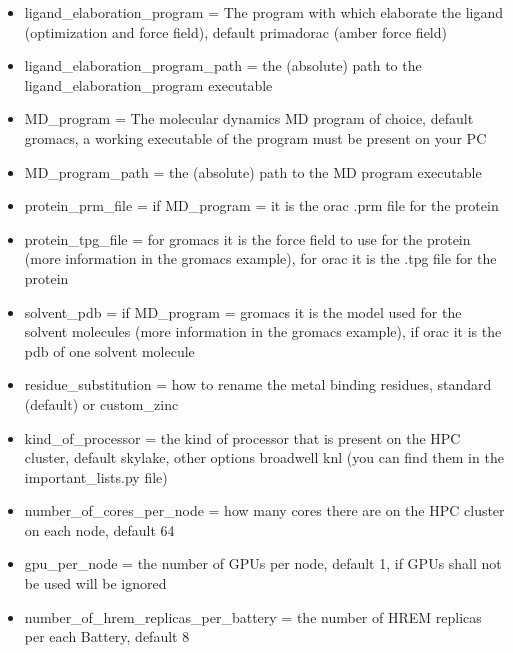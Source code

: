 \begin{itemize}
				\item ligand\_elaboration\_program = The program with which elaborate the ligand (optimization and force field), default primadorac (amber force field)
				
				\item ligand\_elaboration\_program\_path = the (absolute) path to the ligand\_elaboration\_program executable

				
				\item MD\_program = The molecular dynamics MD program of choice, default gromacs, a working executable of the program must be present on your PC
				
				\item MD\_program\_path = the (absolute) path to the MD program executable
				
				\item protein\_prm\_file = if MD\_program = it is the orac .prm file for the protein
				
				\item protein\_tpg\_file = for gromacs it is the force field to use for the protein (more information in the gromacs example), for orac it is the .tpg file for the protein
				
				\item solvent\_pdb = if MD\_program = gromacs it is the model used for the solvent molecules (more information in the gromacs example), if orac it is the pdb of one solvent molecule

				\item residue\_substitution = how to rename the metal binding residues, standard (default) or custom\_zinc\cite{zinc_substitutions}
				
				\item kind\_of\_processor = the kind of processor that is present on the HPC cluster, default skylake, other options broadwell knl (you can find them in the important\_lists.py file)
				
				\item number\_of\_cores\_per\_node = how many cores there are on the HPC cluster on each node, default 64

				\item gpu\_per\_node = the number of GPUs per node, default 1, if GPUs shall not be used will be ignored
				
				\item number\_of\_hrem\_replicas\_per\_battery = the number of HREM replicas per each Battery, default 8
				
			\end{itemize}
	

